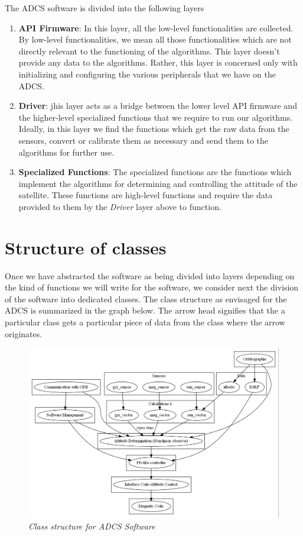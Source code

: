 \documentclass[11pt,a4paper]{report}
\begin{document}
The ADCS software is divided into the following layers 

\begin{enumerate}
\item 
\textbf{API Firmware}: In this layer, all the low-level functionalities are collected. By low-level functionalities, we mean all those functionalities which are not directly relevant to the functioning of the algorithms. This layer doesn't provide any data to the algorithms. Rather, this layer is concerned only with initializing and configuring the various peripherals that we have on the ADCS.
\item 
\textbf{Driver}: jhis layer acts as a bridge between the lower level API firmware and the higher-level specialized functions that we require to run our algorithms. Ideally, in this layer we find the functions which get the raw data from the sensors, convert or calibrate them as necessary and send them to the algorithms for further use.
\item 
\textbf{Specialized Functions}: The specialized functions are the functions which implement the algorithms for determining and controlling the attitude of the satellite. These functions are high-level functions and require the data provided to them by the \textit{Driver} layer above to function. 
\end{enumerate}

\section{Structure of classes} 
Once we have abstracted the software as being divided into layers depending on the kind of functions we will write for the software, we consider next the division of the software into dedicated classes. The class structure as envisaged for the ADCS is summarized in the graph below. The arrow head signifies that the a particular class gets a particular piece of data from the class where the arrow originates. 

\begin{figure}[h]
\centering 
\includegraphics[scale=0.6]{class_structure}
\caption{\textit{Class structure for ADCS Software}}
\label{struct_class}
\end{figure}
\end{document}
